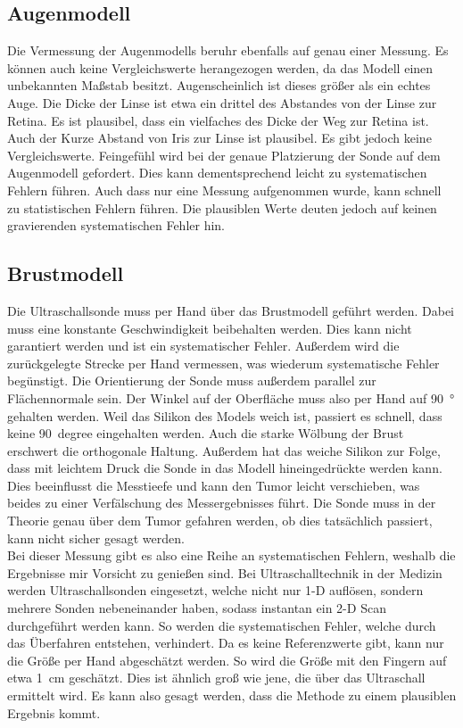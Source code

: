 \subsection{Augenmodell}
Die Vermessung der Augenmodells beruhr ebenfalls auf genau einer Messung. Es können auch keine Vergleichswerte 
herangezogen werden, da das Modell einen unbekannten Maßstab besitzt. Augenscheinlich ist dieses größer als 
ein echtes Auge. Die Dicke der Linse ist etwa ein drittel des Abstandes von der Linse zur Retina. Es ist 
plausibel, dass ein vielfaches des Dicke der Weg zur Retina ist. Auch der Kurze Abstand von Iris zur Linse ist 
plausibel. Es gibt jedoch keine Vergleichswerte. Feingefühl wird bei der genaue Platzierung der Sonde auf 
dem Augenmodell gefordert. Dies kann dementsprechend leicht zu systematischen Fehlern führen. Auch dass nur 
eine Messung aufgenommen wurde, kann schnell zu statistischen Fehlern führen. Die plausiblen Werte deuten jedoch 
auf keinen gravierenden systematischen Fehler hin.


\subsection{Brustmodell}
Die Ultraschallsonde muss per Hand über das Brustmodell geführt werden. Dabei muss eine konstante Geschwindigkeit 
beibehalten werden. Dies kann nicht garantiert werden und ist ein systematischer Fehler. Außerdem wird die 
zurückgelegte Strecke per Hand vermessen, was wiederum systematische Fehler begünstigt. Die Orientierung der Sonde 
muss außerdem parallel zur Flächennormale sein. Der Winkel auf der Oberfläche muss also per Hand auf \qty{90}{\degree} 
gehalten werden. Weil das Silikon des Models weich ist, passiert es schnell, dass keine \qty{90}{degree} eingehalten 
werden. Auch die starke Wölbung der Brust erschwert die orthogonale Haltung. Außerdem hat das weiche Silikon zur 
Folge, dass mit leichtem Druck die Sonde in das Modell hineingedrückte werden kann. Dies beeinflusst die Messtieefe 
und kann den Tumor leicht verschieben, was beides zu einer Verfälschung des Messergebnisses führt. Die Sonde muss 
in der Theorie genau über dem Tumor gefahren werden, ob dies tatsächlich passiert, kann nicht sicher gesagt werden. \\
\noindent Bei dieser Messung gibt es also eine Reihe an systematischen Fehlern, weshalb die Ergebnisse mir Vorsicht 
zu genießen sind. Bei Ultraschalltechnik in der Medizin werden Ultraschallsonden eingesetzt, welche nicht nur 1-D 
auflösen, sondern mehrere Sonden nebeneinander haben, sodass instantan ein 2-D Scan durchgeführt werden kann. So 
werden die systematischen Fehler, welche durch das Überfahren entstehen, verhindert. Da es keine Referenzwerte gibt, 
kann nur die Größe per Hand abgeschätzt werden. So wird die Größe mit den Fingern auf etwa \qty{1}{\centi\meter} geschätzt. 
Dies ist ähnlich groß wie jene, die über das Ultraschall ermittelt wird. Es kann also gesagt werden, dass die 
Methode zu einem plausiblen Ergebnis kommt.


